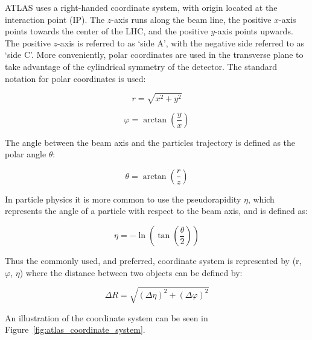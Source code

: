 ATLAS uses a right-handed coordinate system, with origin located at the interaction point (IP). The $z$-axis runs along the beam line, the positive $x$-axis points towards the center of the LHC, and the positive $y$-axis points upwards. The positive $z$-axis is referred to as `side A', with the negative side referred to as `side C'.  More conveniently, polar coordinates are used in the transverse plane to take advantage of the cylindrical symmetry of the detector.
The standard notation for polar coordinates is used:

\begin{equation}
    r = \sqrt{x^2 + y^2}
\end{equation}\label{eq:transverse_radius}

\begin{equation}
    \varphi = \arctan\left(\frac{y}{x}\right)
\end{equation}\label{eq:transverse_phi}

\noindent{}The angle between the beam axis and the particles trajectory is defined as the polar angle $\theta$:

\begin{equation}
    \theta = \arctan\left(\frac{r}{z}\right)
\end{equation}\label{eq:polar_angle}

\noindent{}In particle physics it is more common to use the pseudorapidity $\eta$, which represents the angle of a particle with respect to the beam axis, and is defined as:

\begin{equation}
    \eta = -\ln\left(\tan\left(\frac{\theta}{2}\right)\right)
\end{equation}\label{eq:pseudorapidity}

\noindent{}Thus the commonly used, and preferred, coordinate system is represented by (r, $\varphi$, $\eta$) where the distance between two objects can be defined by:

\begin{equation}
    \Delta R = \sqrt{{(\Delta \eta)}^2 + {(\Delta \varphi)}^2}
\end{equation}\label{eq:delta_R}

\noindent{}An illustration of the coordinate system can be seen in Figure~\ref{fig:atlas_coordinate_system}.

